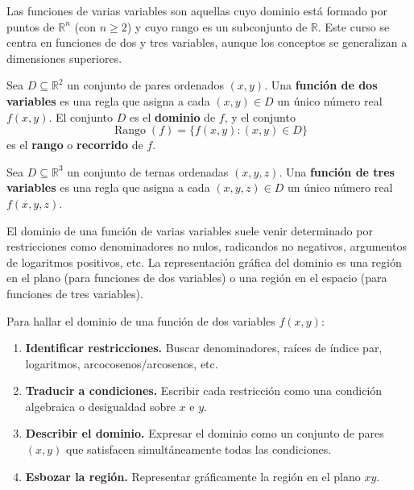 Las funciones de varias variables son aquellas cuyo dominio está
formado por puntos de $\mathbb{R}^n$ (con $n \geq 2$) y cuyo rango es
un subconjunto de $\mathbb{R}$. Este curso se centra en funciones de
dos y tres variables, aunque los conceptos se generalizan a dimensiones
superiores.

\begin{definition}
Sea $D \subseteq \mathbb{R}^2$ un conjunto de pares ordenados $(x,y)$.
Una \textbf{función de dos variables} es una regla que asigna a cada
$(x,y) \in D$ un único número real $f(x,y)$. El conjunto $D$ es el
\textbf{dominio} de $f$, y el conjunto
\[
\operatorname{Rango}(f) = \{ f(x,y) : (x,y) \in D \}
\]
es el \textbf{rango} o \textbf{recorrido} de $f$.
\end{definition}

\begin{definition}
Sea $D \subseteq \mathbb{R}^3$ un conjunto de ternas ordenadas $(x,y,z)$.
Una \textbf{función de tres variables} es una regla que asigna a cada
$(x,y,z) \in D$ un único número real $f(x,y,z)$.
\end{definition}

El dominio de una función de varias variables suele venir determinado
por restricciones como denominadores no nulos, radicandos no negativos,
argumentos de logaritmos positivos, etc. La representación gráfica del
dominio es una región en el plano (para funciones de dos variables) o
una región en el espacio (para funciones de tres variables).

\begin{pasos}
Para hallar el dominio de una función de dos variables $f(x,y)$:
\begin{enumerate}
  \item \textbf{Identificar restricciones.} Buscar denominadores,
        raíces de índice par, logaritmos, arcocosenos/arcosenos, etc.
  \item \textbf{Traducir a condiciones.} Escribir cada restricción como
        una condición algebraica o desigualdad sobre $x$ e $y$.
  \item \textbf{Describir el dominio.} Expresar el dominio como un
        conjunto de pares $(x,y)$ que satisfacen simultáneamente todas
        las condiciones.
  \item \textbf{Esbozar la región.} Representar gráficamente la región
        en el plano $xy$.
\end{enumerate}
\end{pasos}

